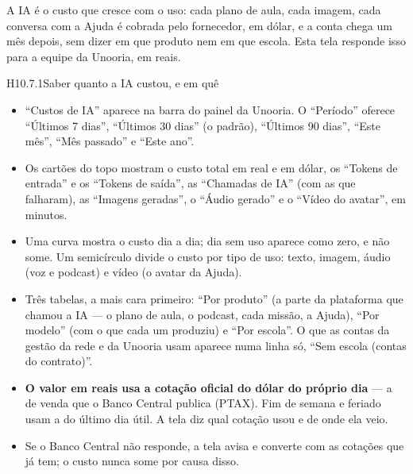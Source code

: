 
A IA é o custo que cresce com o uso: cada plano de aula, cada imagem, cada
conversa com a Ajuda é cobrada pelo fornecedor, em dólar, e a conta chega um mês
depois, sem dizer em que produto nem em que escola. Esta tela responde isso
para a equipe da Unooria, em reais.

\begin{historia}{H10.7.1}{Saber quanto a IA custou, e em quê}{\pronto}
\aceite
\begin{itemize}
  \item \enquote{Custos de IA} aparece na barra do painel da Unooria. O
    \enquote{Período} oferece \enquote{Últimos 7 dias}, \enquote{Últimos 30
    dias} (o padrão), \enquote{Últimos 90 dias}, \enquote{Este mês},
    \enquote{Mês passado} e \enquote{Este ano}.
  \item Os cartões do topo mostram o custo total em real e em dólar, os \enquote{Tokens de entrada} e os
    \enquote{Tokens de saída}, as \enquote{Chamadas de IA} (com as que
    falharam), as \enquote{Imagens geradas}, o \enquote{Áudio gerado} e o
    \enquote{Vídeo do avatar}, em minutos.
  \item Uma curva mostra o custo dia a dia; dia sem uso aparece como zero, e
    não some. Um semicírculo divide o custo por tipo de uso: texto, imagem,
    áudio (voz e podcast) e vídeo (o avatar da Ajuda).
  \item Três tabelas, a mais cara primeiro: \enquote{Por produto} (a parte da
    plataforma que chamou a IA --- o plano de aula, o podcast, cada missão, a
    Ajuda), \enquote{Por modelo} (com o que cada um produziu) e
    \enquote{Por escola}. O que as contas da gestão da rede e da Unooria usam
    aparece numa linha só, \enquote{Sem escola (contas do contrato)}.
  \item \textbf{O valor em reais usa a cotação oficial do dólar do próprio
    dia} --- a de venda que o Banco Central publica (PTAX). Fim de semana e
    feriado usam a do último dia útil. A tela diz qual cotação usou e de
    onde ela veio.
  \item Se o Banco Central não responde, a tela avisa e converte com as
    cotações que já tem; o custo nunca some por causa disso.

\end{itemize}
\end{historia}
